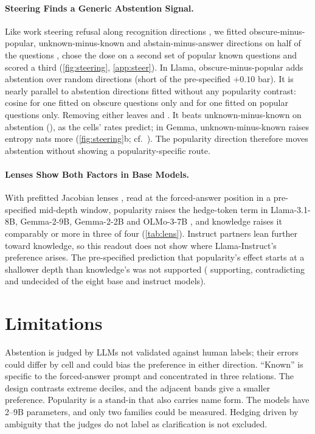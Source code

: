 \documentclass[manuscript,screen,review,anonymous,nonacm]{acmart}
\begin{document}
\paragraph{Steering Finds a Generic Abstention Signal.} Like work steering refusal along recognition directions \cite{ferrando2025iknow,brzezinka2026familiarity}, we fitted obscure-minus-popular, unknown-minus-known and abstain-minus-answer directions on half of the questions \cite{arditi2024refusal,rimsky2024caa}, chose the dose on a second set of popular known questions and scored a third (\cref{fig:steering}, \cref{app:steer}). In Llama, obscure-minus-popular adds \svLlamaDOne{} \svLlamaDOneCI{} abstention over random directions (short of the pre-specified $+0.10$ bar). It is nearly parallel to abstention directions fitted without any popularity contrast: cosine \wlLlamaCos{} for one fitted on obscure questions only and \gaCos{} for one fitted on popular questions only. Removing either leaves \wlLlamaDTwo{} \wlLlamaDTwoCI{} and \gaPerp{} \gaPerpCI. It beats unknown-minus-known on abstention (\svLlamaDThree), as the cells' rates predict; in Gemma, unknown-minus-known raises entropy \svGemmaDFour{} \svGemmaDFourCI{} nats more (\cref{fig:steering}b; cf.\ \cite{che2026steering}). The popularity direction therefore moves abstention without showing a popularity-specific route.

\paragraph{Lenses Show Both Factors in Base Models.} With prefitted Jacobian lenses \cite{gurnee2026workspace}, read at the forced-answer position in a pre-specified mid-depth window, popularity raises the hedge-token term in Llama-3.1-8B, Gemma-2-9B, Gemma-2-2B and OLMo-3-7B \cite{olmo3}, and knowledge raises it comparably or more in three of four (\cref{tab:lens}). Instruct partners lean further toward knowledge, so this readout does not show where Llama-Instruct's preference arises. The pre-specified prediction that popularity's effect starts at a shallower depth than knowledge's was not supported (\jlSupports{} supporting, \jlContradicts{} contradicting and \jlUndecided{} undecided of the eight base and instruct models).

\section{Limitations}

Abstention is judged by LLMs not validated against human labels; their errors could differ by cell and could bias the preference in either direction. ``Known'' is specific to the forced-answer prompt and concentrated in three relations. The design contrasts extreme deciles, and the adjacent bands give a smaller preference. Popularity is a stand-in that also carries name form. The models have 2--9B parameters, and only two families could be measured. Hedging driven by ambiguity that the judges do not label as clarification is not excluded.
\end{document}
